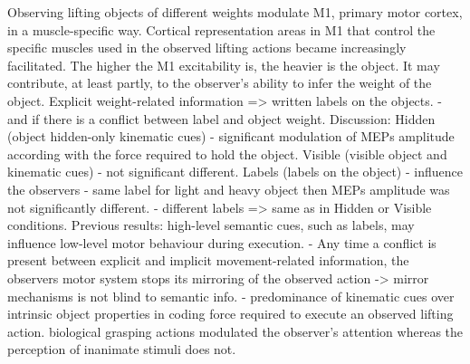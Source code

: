 \cite{alaerts_force_2010} Observing lifting objects of different weights modulate M1, primary motor cortex, in a muscle-specific way. Cortical representation areas in M1 that control the specific muscles used in the observed lifting actions became increasingly facilitated. The higher the M1 excitability is, the heavier is the object. It may contribute, at least partly, to the observer's ability to infer the weight of the object. 
 \cite{senot_effect_2011}
Explicit weight-related information => written labels on the objects. - and if there is a conflict between label and object weight. 
Discussion: Hidden (object hidden-only kinematic cues) - significant modulation of MEPs amplitude according with the force required to hold the object. Visible (visible object and kinematic cues) - not significant different. Labels (labels on the object) - influence the observers - same label for light and heavy object then MEPs amplitude was not significantly different. - different labels => same as in Hidden or Visible conditions. 
Previous results: high-level semantic cues, such as labels, may influence low-level motor behaviour during execution. - Any time a conflict is present between explicit and implicit movement-related information, the observers motor system stops its mirroring of the observed action -> mirror mechanisms is not blind to semantic info. - predominance of kinematic cues over intrinsic object properties in coding force required to execute an observed lifting action. 
\cite{lindemann_grasping_2011} biological grasping actions modulated the observer's attention whereas the perception of inanimate stimuli does not.

